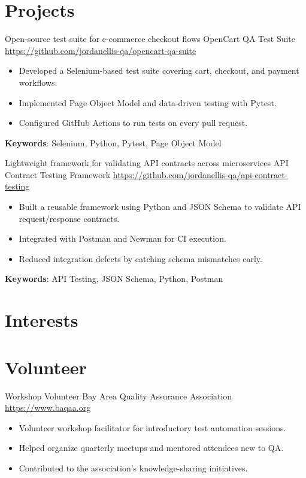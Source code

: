 \documentclass[a4paper, serif, 10pt]{moderncv}
\begin{document}
\section{Projects}

        {Open-source test suite for e-commerce checkout flows}
        {OpenCart QA Test Suite}
        {\url{https://github.com/jordanellis-qa/opencart-qa-suite}}
        {}
        {\begin{itemize}
\item Developed a Selenium-based test suite covering cart, checkout, and payment workflows.
\item Implemented Page Object Model and data-driven testing with Pytest.
\item Configured GitHub Actions to run tests on every pull request.
\end{itemize}
\textbf{Keywords}: Selenium, Python, Pytest, Page Object Model}

        {Lightweight framework for validating API contracts across microservices}
        {API Contract Testing Framework}
        {\url{https://github.com/jordanellis-qa/api-contract-testing}}
        {}
        {\begin{itemize}
\item Built a reusable framework using Python and JSON Schema to validate API request/response contracts.
\item Integrated with Postman and Newman for CI execution.
\item Reduced integration defects by catching schema mismatches early.
\end{itemize}
\textbf{Keywords}: API Testing, JSON Schema, Python, Postman}
\section{Interests}

\section{Volunteer}

        {Workshop Volunteer}
        {Bay Area Quality Assurance Association}
        {\url{https://www.baqaa.org}}
        {}
        {\begin{itemize}
\item Volunteer workshop facilitator for introductory test automation sessions.
\item Helped organize quarterly meetups and mentored attendees new to QA.
\item Contributed to the association's knowledge-sharing initiatives.
\end{itemize}}
    
\end{document}
